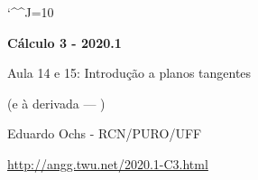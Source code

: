 \documentclass[oneside,12pt]{article}
\begin{document}
\catcode`\^^J=10


\long{}
\long{}
\long{}
\long{}
\long{}
\long{}
\long{}
\long{}
\long{}
\long{}

\long{}
\long{}

\def\frown{\ensuremath{{=}{(}}}
\def\True {\mathbf{V}}
\def\False{\mathbf{F}}

\def\drafturl{http://angg.twu.net/LATEX/2020-1-C2.pdf}
\def\drafturl{http://angg.twu.net/2020.1-C2.html}
\def\draftfooter{\tiny \href{\drafturl}{\jobname{}} \ColorBrown{\shorttoday{} \hours}}


%

\thispagestyle{empty}

\begin{center}

\vspace*{1.2cm}

{\bf \Large Cálculo 3 - 2020.1}

\bsk

Aula 14 e 15: Introdução a planos tangentes

(e à derivada --- )

\bsk

Eduardo Ochs - RCN/PURO/UFF

\url{http://angg.twu.net/2020.1-C3.html}

\end{center}
\end{document}
